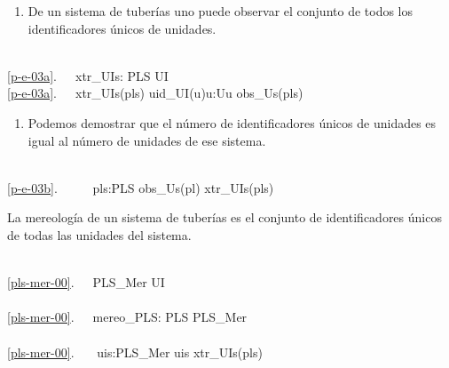 \mnewfoil
\begin{enumerate}\setei
\item \label{p-e-03a} De un sistema de tuberías uno puede observar 
el conjunto de todos los identificadores únicos de unidades.
\savei\end{enumerate}


\bp
\>\ \\
\ref{p-e-03a}.\ \ \ xtr\_UIs: PLS {\RIGHTARROW} UI\\
\ref{p-e-03a}.\ \ \ xtr\_UIs(pls) {\IS} {\LBRACE}uid\_UI(u){\BAR}u:U{\RDOT}u {\ISIN} obs\_Us(pls){\RBRACE}
\ep

\begin{enumerate}\setei
\item \label{p-e-03b} Podemos demostrar que el número de identificadores
                      únicos de unidades es igual al número de unidades de ese sistema.
\savei\end{enumerate}


\bp
\>\ \\
\ref{p-e-03b}.\ \ \ \ \ {\ALL} pls:PLS{\RDOT} obs\_Us(pl){\EQ} xtr\_UIs(pls)
\ep

\label{PLS Mereology}\LLLL\HHHH


\item \label{pls-mer-00}La mereología de un sistema de tuberías es el 
  conjunto de identificadores únicos de todas las unidades del sistema.
\begin{enumerate}\setei
\savei\end{enumerate}

\bp
{}\\
\ref{pls-mer-00}.\ \ \ PLS\_Mer {\EQ} UI\\
\\
\ref{pls-mer-00}.\ \ \ mereo\_PLS: PLS {\RIGHTARROW} PLS\_Mer\\
\\
\ref{pls-mer-00}.\ \ \ {\ALL} uis:PLS\_Mer {\RDOT} uis {\EQ}  xtr\_UIs(pls)
\ep

